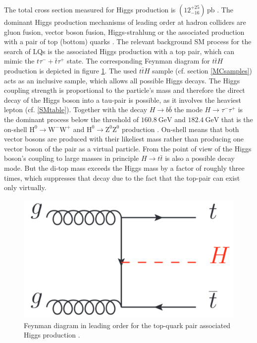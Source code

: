 The total cross section measured for Higgs production is $\left( 12^{+25}_{-16} \right)\,\text{pb}$ \cite{HiggsCrossSection}. The dominant Higgs production mechanisms of leading order at hadron colliders are gluon fusion, vector boson fusion, Higgs-strahlung or the associated production with a pair of top (bottom) quarks \cite{PhysRevD}. The relevant background SM process for the search of LQs is the associated Higgs production with a top pair, which can mimic the $t\tau^{-}+\bar{t}\tau^{+}$ state. The corresponding Feynman diagram for $t\bar{t}H$ production is depicted in figure \ref{ttHproduction}. The used $t\bar{t}H$ sample (cf. section \ref{MCsamples}) acts as an inclusive sample, which allows all possible Higgs decays. The Higgs coupling strength is proportional to the particle's mass and therefore the direct decay of the Higgs boson into a tau-pair is possible, as it involves the heaviest lepton (cf. \ref{SMtable}). Together with the decay $H\rightarrow b\bar{b}$ the mode $H\rightarrow \tau^-\tau^+$ is the dominant process below the threshold of $\SI{160.8}{\giga\electronvolt}$ and $\SI{182.4}{\giga\electronvolt}$ that is the on-shell $\text{H}^0\rightarrow\text{W}^-\text{W}^+$ and $\text{H}^0\rightarrow\text{Z}^0\text{Z}^0$ production \cite{PhysRevD}. On-shell means that both vector bosons are produced with their likeliest mass rather than producing one vector boson of the pair as a virtual particle. From the point of view of the Higgs boson's coupling to large masses in principle $H\rightarrow t\bar{t}$ is also a possible decay mode. But the di-top mass exceeds the Higgs mass by a factor of roughly three times, which suppresses that decay due to the fact that the top-pair can exist only virtually.    
%
\begin{figure}[htbp]                                 
 \begin{center}                                       
  \includegraphics[width=0.3\linewidth]{figures/ttHproduction.pdf} 
   \caption[Higgs production associated with a top-quark pair.]{Feynman diagram in leading order for the top-quark pair associated Higgs production \cite{PhysRevD}.}
  \label{ttHproduction}                                    
 \end{center}
\end{figure}
